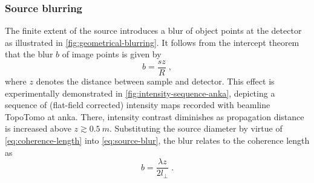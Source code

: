 \documentclass[
twoside,
openright,
titlepage,
numbers=noenddot,
headinclude,
fleqn,
a4paper,
footinclude=true,
cleardoublepage=empty,
abstractoff,
BCOR=5mm,
paper=a4,
fontsize=11pt,
british,ngerman,american,
]{scrreprt}
\begin{document}
\subsubsection{Source blurring}
\label{sec:source-blurring}

The finite extent of the source introduces a blur of object points at
the detector as illustrated in \cref{fig:geometrical-blurring}.  It
follows from the intercept theorem that the blur $b$ of image points
is given by
\begin{equation}
  \label{eq:source-blur}
  b = \frac{s z}{R} \;,
\end{equation}
where $z$ denotes the distance between sample and detector.  This
effect is experimentally demonstrated in
\cref{fig:intensity-sequence-anka}, depicting a sequence of (flat-field
corrected) intensity maps recorded with beamline TopoTomo at
\ac{anka}.  There, intensity contrast diminishes as propagation
distance is increased above $z\gtrsim\SI{0.5}{m}$.  Substituting the
source diameter by virtue of \cref{eq:coherence-length} into
\cref{eq:source-blur}, the blur relates to the coherence length as
\begin{equation}
  \label{eq:source-blur-coherence}
  b = \frac{\lambda z}{2 l_\perp} \;.
\end{equation}
\end{document}
